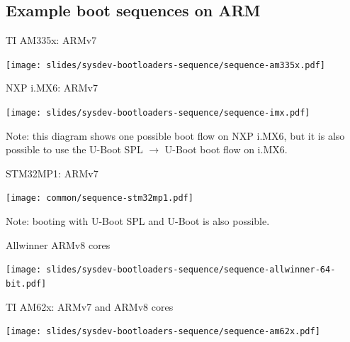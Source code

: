 \subsection{Example boot sequences on ARM}

\begin{frame}{TI AM335x: ARMv7}
  \begin{center}
    \texttt{[image: slides/sysdev-bootloaders-sequence/sequence-am335x.pdf]}
  \end{center}
\end{frame}

\begin{frame}{NXP i.MX6: ARMv7}
  \begin{center}
    \texttt{[image: slides/sysdev-bootloaders-sequence/sequence-imx.pdf]}
  \end{center}
  \vspace{0.1cm}
  Note: this diagram shows one possible boot flow on NXP i.MX6, but it
  is also possible to use the U-Boot SPL $\rightarrow$ U-Boot boot
  flow on i.MX6.
\end{frame}

\begin{frame}{STM32MP1: ARMv7}
  \begin{center}
    \texttt{[image: common/sequence-stm32mp1.pdf]}
  \end{center}
  \vspace{0.3cm}
  Note: booting with U-Boot SPL and U-Boot is also possible.
\end{frame}

\begin{frame}{Allwinner ARMv8 cores}
  \begin{center}
    \texttt{[image: slides/sysdev-bootloaders-sequence/sequence-allwinner-64-bit.pdf]}
  \end{center}
\end{frame}

\begin{frame}{TI AM62x: ARMv7 and ARMv8 cores}
  \begin{center}
    \texttt{[image: slides/sysdev-bootloaders-sequence/sequence-am62x.pdf]}
  \end{center}
\end{frame}
